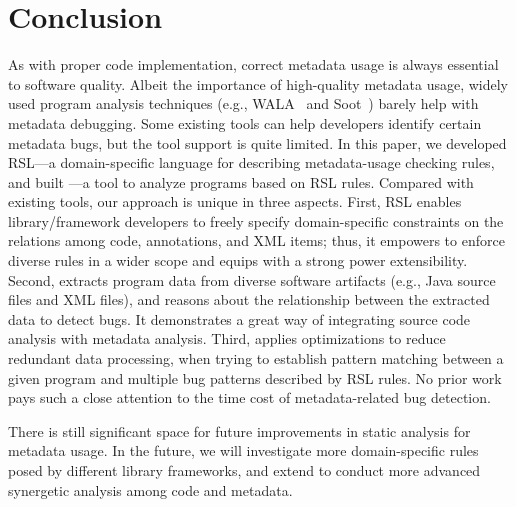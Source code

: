 \vspace{-.5em}
\section{Conclusion}\label{se:conclusion}

As with proper code implementation, correct metadata usage is always essential to software quality. Albeit the importance of high-quality metadata usage, widely used program analysis techniques (e.g., WALA~\cite{wala} and Soot~\cite{soot}) barely help with metadata debugging.
Some existing tools can help developers identify certain metadata bugs, but the tool support is quite limited. 
In this paper, we developed RSL---a domain-specific language for describing metadata-usage checking rules, and built \tool---a tool to analyze programs based on RSL rules. Compared with existing tools, our approach is unique in three aspects. First, RSL enables library/framework developers to freely specify domain-specific constraints on the relations among code, annotations, and XML items; thus, it empowers \tool to enforce diverse rules in a wider scope and equips \tool with a strong power extensibility. 
Second, \tool extracts program data from diverse software artifacts (e.g., Java source files and XML files), and reasons about the relationship between the extracted data to detect bugs. It demonstrates a great way of integrating source code analysis with metadata analysis. Third, \tool applies optimizations to reduce redundant data processing, when trying to establish pattern matching between a given program and multiple bug patterns described by RSL rules. No prior work pays such a close attention to the time cost of metadata-related bug detection.

There is still significant space for future improvements in static analysis for metadata usage. 
In the future, we will investigate more domain-specific rules posed by different library frameworks, and extend \tool to conduct more advanced synergetic analysis among code and metadata.




